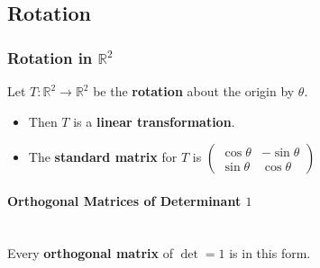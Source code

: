 \documentclass[../ma2001_notes.tex]{subfiles}
\begin{document}
\subsection{Rotation}
\subsubsection{Rotation in $\mathbb{R}^2$}
Let \(T:\mathbb{R}^2\to\mathbb{R}^2\) be the \textbf{rotation} about the origin by \(\theta\).
\begin{itemize}
	\item Then \(T\) is a \textbf{linear transformation}.
	\item The \textbf{standard matrix} for \(T\) is \(\begin{pmatrix}
		\cos\theta & -\sin\theta \\ \sin\theta & \cos\theta
	\end{pmatrix}\)
\end{itemize}

\paragraph{Orthogonal Matrices of Determinant $1$}\,\\
Every \textbf{orthogonal matrix} of \(\det=1\) is in this form.
\end{document}
